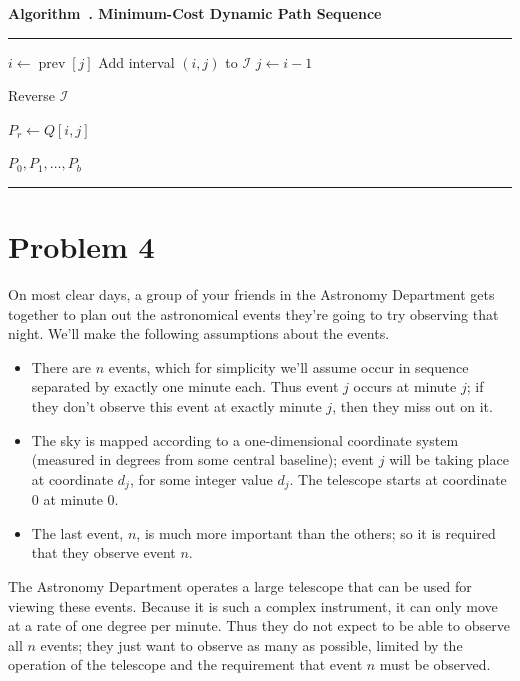 \documentclass[12pt,a4paper]{article}
\newenvironment{breakablealgorithm}[1]{%
  \par\addvspace{1em}
  \refstepcounter{algorithm}%
  \noindent\textbf{Algorithm~\thealgorithm. #1}\par\nobreak
  \noindent\rule{\linewidth}{0.4pt}\par\nobreak
  \vspace{0.4em}
}{%
  \par\vspace{0.2em}
  \noindent\rule{\linewidth}{0.4pt}
  \par\addvspace{1em}
}
\begin{document}
\begin{answerbox}
\begin{breakablealgorithm}{Minimum-Cost Dynamic Path Sequence}
\begin{algorithmic}[1]
    \State $i\gets \operatorname{prev}[j]$
    \State Add interval $(i,j)$ to $\mathcal{I}$
    \State $j\gets i-1$
\EndWhile

\State Reverse $\mathcal{I}$

        \State $P_r\gets Q[i,j]$
    \EndFor
\EndFor

\State \Return $P_0,P_1,\ldots,P_b$

\end{algorithmic}
\end{breakablealgorithm}

\end{answerbox}

\section{Problem 4}

On most clear days, a group of your friends in the Astronomy Department gets together to plan out the astronomical events they're going to try observing that night. We'll make the following assumptions about the events.

\begin{itemize}[leftmargin=2em]
\item There are $n$ events, which for simplicity we'll assume occur in sequence separated by exactly one minute each. Thus event $j$ occurs at minute $j$; if they don't observe this event at exactly minute $j$, then they miss out on it.

\item The sky is mapped according to a one-dimensional coordinate system (measured in degrees from some central baseline); event $j$ will be taking place at coordinate $d_j$, for some integer value $d_j$. The telescope starts at coordinate 0 at minute 0.

\item The last event, $n$, is much more important than the others; so it is required that they observe event $n$.
\end{itemize}

The Astronomy Department operates a large telescope that can be used for viewing these events. Because it is such a complex instrument, it can only move at a rate of one degree per minute. Thus they do not expect to be able to observe all $n$ events; they just want to observe as many as possible, limited by the operation of the telescope and the requirement that event $n$ must be observed.
\end{document}
